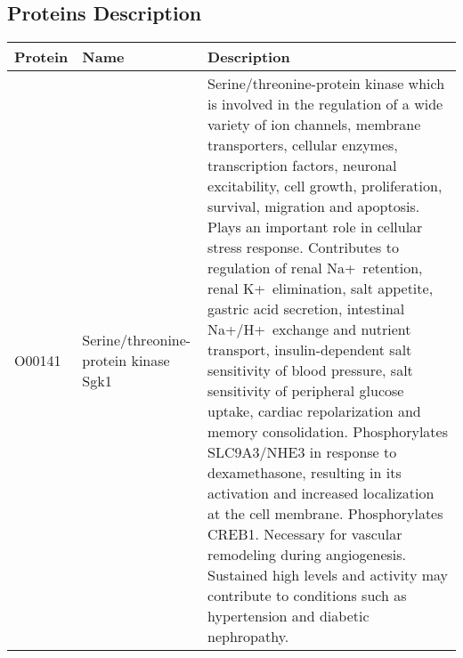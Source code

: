 \begin{landscape}
\section{Proteins Description}
\begin{table}[H]
    \caption[Protein Description]{Description of proteins used in the thesis work. Source: https://www.ncbi.nlm.nih.gov/pubmed/ }
    \label{table:protein descriptions}
    \begin{longtable}{|p{1.5cm}|p{3.7cm}|p{18cm}|}
        \hline
        
        Protein & Name & Description \\ \hline \toprule \hline
        O00141 & Serine/threonine-protein kinase Sgk1 & Serine/threonine-protein kinase which is involved in the regulation of a wide variety of ion channels, membrane transporters, cellular enzymes, transcription factors, neuronal excitability, cell growth, proliferation, survival, migration and apoptosis. Plays an important role in cellular stress response. Contributes to regulation of renal Na+ retention, renal K+ elimination, salt appetite, gastric acid secretion, intestinal Na+/H+ exchange and nutrient transport, insulin-dependent salt sensitivity of blood pressure, salt sensitivity of peripheral glucose uptake, cardiac repolarization and memory consolidation. Phosphorylates SLC9A3/NHE3 in response to dexamethasone, resulting in its activation and increased localization at the cell membrane. Phosphorylates CREB1. Necessary for vascular remodeling during angiogenesis. Sustained high levels and activity may contribute to conditions such as hypertension and diabetic nephropathy. \\ \hline

\end{longtable}
\end{table}
\end{landscape}
